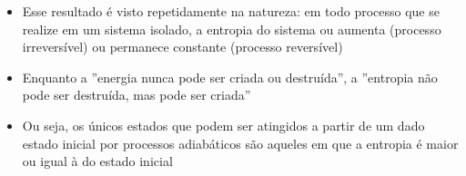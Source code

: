 \documentclass[t,%
brazilian,%
11pt,%
aspectratio=169,%
table%
]{beamer}
\begin{document}
\begin{frame}
    \begin{itemize}
        \item Esse resultado é visto repetidamente na natureza: em todo processo
            que se realize em um sistema isolado, a entropia do sistema ou aumenta 
            (processo irreversível) ou permanece constante (processo reversível)
        \item Enquanto a ''energia nunca pode ser criada ou destruída'', a ''entropia não
            pode ser destruída, mas pode ser criada''
        \item Ou seja, os únicos estados que podem ser atingidos a partir de um dado
            estado inicial por processos adiabáticos são aqueles em que a entropia é
            maior ou igual à do estado inicial
    \end{itemize}
\end{frame}


\end{document}
